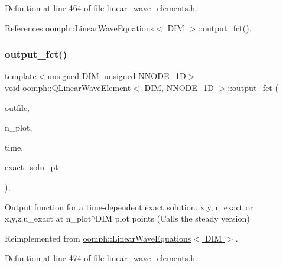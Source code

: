 Definition at line 464 of file linear\+\_\+wave\+\_\+elements.\+h.



References oomph\+::\+Linear\+Wave\+Equations$<$ D\+I\+M $>$\+::output\+\_\+fct().

\mbox{\label{classoomph_1_1QLinearWaveElement_af991bd517d135fe1320074b28ed84b02}} 
\subsubsection{\texorpdfstring{output\+\_\+fct()}{output\_fct()}\hspace{0.1cm}{\footnotesize\ttfamily [2/2]}}
{\footnotesize\ttfamily template$<$unsigned D\+IM, unsigned N\+N\+O\+D\+E\+\_\+1D$>$ \\
void \hyperlink{classoomph_1_1QLinearWaveElement}{oomph\+::\+Q\+Linear\+Wave\+Element}$<$ D\+IM, N\+N\+O\+D\+E\+\_\+1D $>$\+::output\+\_\+fct (\begin{DoxyParamCaption}\item[{std\+::ostream \&}]{outfile,  }\item[{const unsigned \&}]{n\+\_\+plot,  }\item[{const double \&}]{time,  }\item[{\hyperlink{classoomph_1_1FiniteElement_ad4ecf2b61b158a4b4d351a60d23c633e}{Finite\+Element\+::\+Unsteady\+Exact\+Solution\+Fct\+Pt}}]{exact\+\_\+soln\+\_\+pt }\end{DoxyParamCaption})\hspace{0.3cm}{\ttfamily [inline]}, {\ttfamily [virtual]}}



Output function for a time-\/dependent exact solution. x,y,u\+\_\+exact or x,y,z,u\+\_\+exact at n\+\_\+plot$^\wedge$\+D\+IM plot points (Calls the steady version) 



Reimplemented from \hyperlink{classoomph_1_1LinearWaveEquations_aa0089c4e106d9bd525639d3215ed6825}{oomph\+::\+Linear\+Wave\+Equations$<$ D\+I\+M $>$}.



Definition at line 474 of file linear\+\_\+wave\+\_\+elements.\+h.



